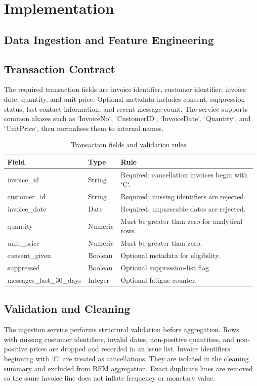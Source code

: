 \documentclass[12pt,a4paper]{report}
\begin{document}
\chapter{Implementation}
\section{Data Ingestion and Feature Engineering}
\section{Transaction Contract}
The required transaction fields are invoice identifier, customer identifier, invoice date, quantity, and unit price. Optional metadata includes consent, suppression status, last-contact information, and recent-message count. The service supports common aliases such as `InvoiceNo`, `CustomerID`, `InvoiceDate`, `Quantity`, and `UnitPrice`, then normalises them to internal names.

\begin{table}[H]
\centering
\caption{Transaction fields and validation rules}
\label{tab:contract}\small
\begin{tabular}{p{}p{}p{}}
\toprule
Field & Type & Rule\\\midrule
invoice\_id & String & Required; cancellation invoices begin with `C`.\\
customer\_id & String & Required; missing identifiers are rejected.\\
invoice\_date & Date & Required; unparseable dates are rejected.\\
quantity & Numeric & Must be greater than zero for analytical rows.\\
unit\_price & Numeric & Must be greater than zero.\\
consent\_given & Boolean & Optional metadata for eligibility.\\
suppressed & Boolean & Optional suppression-list flag.\\
messages\_last\_30\_days & Integer & Optional fatigue counter.\\\bottomrule
\end{tabular}
\end{table}

\section{Validation and Cleaning}
The ingestion service performs structural validation before aggregation. Rows with missing customer identifiers, invalid dates, non-positive quantities, and non-positive prices are dropped and recorded in an issue list. Invoice identifiers beginning with `C` are treated as cancellations. They are isolated in the cleaning summary and excluded from RFM aggregation. Exact duplicate lines are removed so the same invoice line does not inflate frequency or monetary value.
\end{document}
